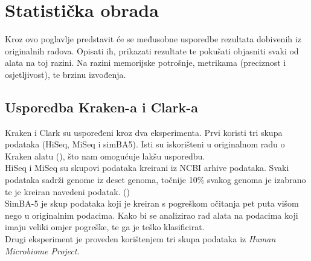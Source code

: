 \documentclass[times, utf8, seminar]{fer}
\begin{document}
\chapter{Statistička obrada}
Kroz ovo poglavlje predstavit će se međusobne usporedbe rezultata dobivenih iz originalnih radova. Opisati ih, prikazati rezultate te pokušati objasniti svaki od alata na toj razini. Na razini memorijske potrošnje, metrikama (preciznost i osjetljivost), te brzinu izvođenja.
\section{Usporedba Kraken-a i Clark-a}
Kraken i Clark su uspoređeni kroz dva eksperimenta. Prvi koristi tri skupa podataka (HiSeq, MiSeq i simBA5). Isti su iskorišteni u originalnom radu o Kraken alatu (\cite{Kraken}), što nam omogućuje lakšu usporedbu.
\\HiSeq i MiSeq su skupovi podataka kreirani iz NCBI arhive podataka. Svaki podataka sadrži genome iz deset genoma, točnije 10\% svakog genoma je izabrano te je kreiran navedeni podatak. (\cite{CLARK})
\\SimBA-5 je skup podataka koji je kreiran s pogreškom očitanja pet puta višom nego u originalnim podacima. Kako bi se analizirao rad alata na podacima koji imaju veliki omjer pogreške, te ga je teško klasificirat.\cite{CLARK}
\\Drugi eksperiment je proveden korištenjem tri skupa podataka iz \textit{Human Microbiome Project}.
\end{document}
